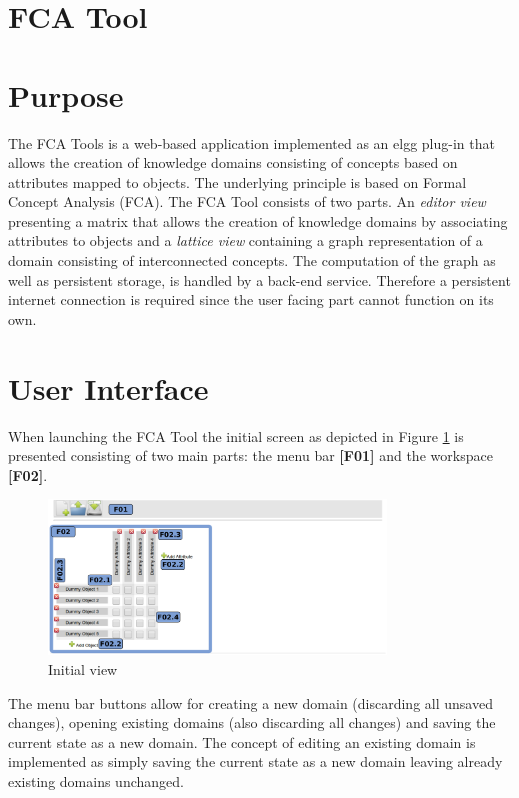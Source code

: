 \documentclass[a4paper,11pt]{article}
\title{}
\author{}
\begin{document}
\section*{{\LARGE FCA Tool}}
\section{Purpose}
The FCA Tools is a web-based application implemented as an elgg plug-in that allows the creation of knowledge domains consisting of concepts based on attributes mapped to objects. The underlying principle is based on Formal Concept Analysis (FCA). The FCA Tool consists of two parts. An \emph{editor view} presenting a matrix that allows the creation of knowledge domains by associating attributes to objects and a \emph{lattice view} containing a graph representation of a domain consisting of interconnected concepts. The computation of the graph as well as persistent storage, is handled by a back-end service. Therefore a persistent internet connection is required since the user facing part cannot function on its own.
\section{User Interface}
When launching the FCA Tool the initial screen as depicted in Figure \ref{fig:fca-init} is presented consisting of two main parts: the menu bar \textbf{[F01]} and the workspace \textbf{[F02]}.\\
\begin{figure}[h]
\begin{center}
\includegraphics[width=0.8\textwidth]{figures/01_main}  
\end{center}
\caption{Initial view}
\label{fig:fca-init}
\end{figure}

The menu bar buttons allow for creating a new domain (discarding all unsaved changes), opening existing domains (also discarding all changes) and saving the current state as a new domain.
The concept of editing an existing domain is implemented as simply saving the current state as a new domain leaving already existing domains unchanged.
\end{document}
